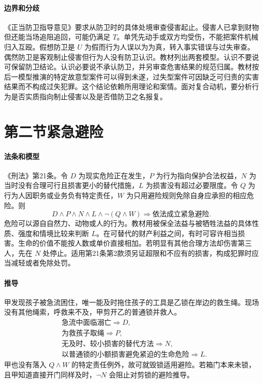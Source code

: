 \paragraph{边界和分歧}
《正当防卫指导意见》要求从防卫时的具体处境审查侵害起止。侵害人已拿到财物但还能当场追阻追回，可能仍满足 \(T\)。单凭先动手或双方均受伤，不能把案件机械归入互殴。假想防卫是 \(U\) 为假而行为人误以为为真，转入事实错误与过失审查。偶然防卫是客观制止侵害但行为人没有防卫认识。教材列出两套模型。认识不要说可保留防卫结论。认识必要说不承认防卫，并另审查危害结果的规范归属。教材按后一模型推演的特定故意型案件可以得到未遂，过失型案件可因缺乏可归责的实害结果而不构成过失犯罪。这个结论依赖所用理论和案情。面对复合动机，要分析行为是否实质指向制止侵害以及是否借防卫之名报复。

\section{第二节\quad 紧急避险}

\paragraph{法条和模型}
《刑法》第21条。令 \(D\) 为现实危险正在发生，\(P\) 为行为指向保护合法权益，\(N\) 为当时没有合理可行且损害更小的替代措施，\(L\) 为损害没有超过必要限度。令 \(Q\) 为行为人因职务或业务负有特定责任，\(W\) 为只用避险规则免除自身应承担的相应危险。则
\[
D\land P\land N\land L\land\neg(Q\land W)
\Longrightarrow \text{依法成立紧急避险}.
\]
危险可以源自自然力、动物或人的行为。教材用被保全法益与被牺牲法益的具体性质、强度和情境比较来判断 \(L\)。在可替代的财产利益之间，有时可容许相当损害。生命的价值不能按人数或单价直接相加。若明显有其他合理方法却伤害第三人，先在 \(N\) 处停止。适用第21条第2款须另证超限和不应有的损害，构成犯罪时应当减轻或者免除处罚。

\paragraph{推导}
甲发现孩子被急流困住，唯一能及时拖住孩子的工具是乙锁在岸边的救生绳。现场没有其他绳索，呼救来不及，甲剪开乙的普通锁并救人。
\[
\begin{aligned}
&\text{急流中面临溺亡}\Longrightarrow D,\\
&\text{为救孩子取绳}\Longrightarrow P,\\
&\text{无及时、较小损害的替代方法}\Longrightarrow N,\\
&\text{以普通锁的小额损害避免紧迫的生命危险}\Longrightarrow L.
\end{aligned}
\]
甲也没有落入 \(Q\land W\) 的特定责任例外，故可就毁锁适用避险。若箱门本来未锁，且甲知道直接开门同样及时，\(\neg N\) 会阻止对剪锁的避险推导。

